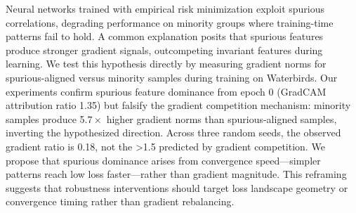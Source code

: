 
Neural networks trained with empirical risk minimization exploit spurious correlations, degrading performance on minority groups where training-time patterns fail to hold. A common explanation posits that spurious features produce stronger gradient signals, outcompeting invariant features during learning. We test this hypothesis directly by measuring gradient norms for spurious-aligned versus minority samples during training on Waterbirds. Our experiments confirm spurious feature dominance from epoch 0 (GradCAM attribution ratio 1.35) but falsify the gradient competition mechanism: minority samples produce 5.$7\times$ higher gradient norms than spurious-aligned samples, inverting the hypothesized direction. Across three random seeds, the observed gradient ratio is 0.18, not the >1.5 predicted by gradient competition. We propose that spurious dominance arises from convergence speed---simpler patterns reach low loss faster---rather than gradient magnitude. This reframing suggests that robustness interventions should target loss landscape geometry or convergence timing rather than gradient rebalancing.

